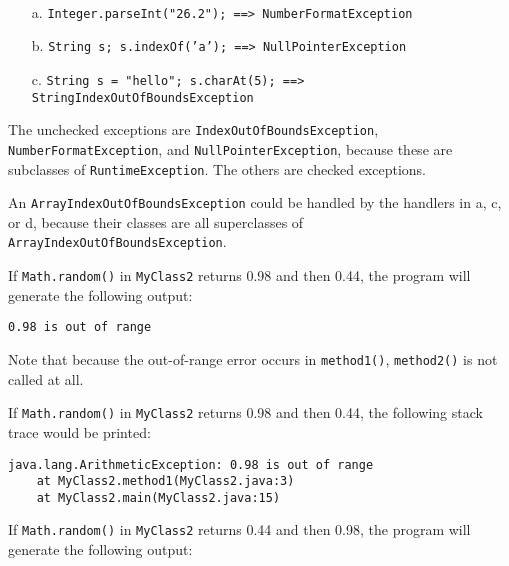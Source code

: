\begin{ANS}
\item \mbox{ }
\begin{enumerate}

\item[a.]  {\tt Integer.parseInt("26.2");        ==> NumberFormatException}  
\item[b.]  {\tt String s; s.indexOf('a');        ==> NullPointerException}    
\item[c.]  {\tt String s = "hello"; s.charAt(5); ==> String\-Index\-Out\-Of\-BoundsException}  

\end{enumerate}

\item  The unchecked exceptions are {\tt IndexOut\-OfBounds\-Exception},
{\tt NumberFormatException}, and {\tt NullPointer\-Exception}, because
these are subclasses of {\tt Runtime\-Exception}. The others are
checked exceptions.

\item  An {\tt ArrayIndexOutOf\-Bounds\-Exception} could be handled by
the handlers in a, c, or d, because their classes
are all superclasses of {\tt Array\-IndexOutOfBoundsException}.

\item  If {\tt Math.random()} in {\tt MyClass2} returns 0.98 and then
0.44, the program will generate the following output: 

\begin{jjjlisting}
\begin{lstlisting}
0.98 is out of range
\end{lstlisting}
\end{jjjlisting}

\noindent Note that because the out-of-range error occurs in {\tt method1()},
{\tt method2()} is not called at all.

\item  If {\tt Math.random()} in {\tt MyClass2} returns 0.98 and then
0.44, the following stack trace would be printed:

\begin{jjjlisting}
\begin{lstlisting}
java.lang.ArithmeticException: 0.98 is out of range
    at MyClass2.method1(MyClass2.java:3)
    at MyClass2.main(MyClass2.java:15)
\end{lstlisting}
\end{jjjlisting}

\item  If {\tt Math.random()} in {\tt MyClass2} returns 0.44 and then
0.98, the program will generate the following output:


\end{ANS}
